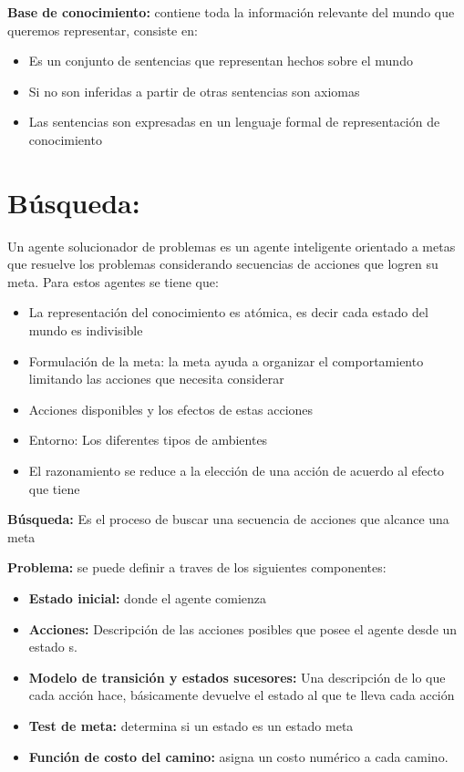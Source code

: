 \textbf{Base de conocimiento: }contiene toda la información relevante del mundo que queremos representar, consiste en: 
\begin{itemize}
  \item Es un conjunto de sentencias que representan hechos sobre el mundo
  \item Si no son inferidas a partir de otras sentencias son axiomas
  \item Las sentencias son expresadas en un lenguaje formal de representación de conocimiento
\end{itemize}

\section{Búsqueda: }
Un agente solucionador de problemas es un agente inteligente orientado a metas que resuelve los problemas considerando secuencias de acciones que logren su meta. Para estos agentes se tiene que:
\begin{itemize}
  \item La representación del conocimiento es atómica, es decir cada estado del mundo es indivisible
  \item Formulación de la meta: la meta ayuda a organizar el comportamiento limitando las acciones que necesita considerar
  \item Acciones disponibles y los efectos de estas acciones
  \item Entorno: Los diferentes tipos de ambientes
  \item El razonamiento se reduce a la elección de una acción de acuerdo al efecto que tiene
\end{itemize}

\textbf{Búsqueda: }Es el proceso de buscar una secuencia de acciones que alcance una meta

\textbf{Problema: }se puede definir a traves de los siguientes componentes:
\begin{itemize}
  \item \textbf{Estado inicial:} donde el agente comienza
  \item \textbf{Acciones:} Descripción de las acciones posibles que posee el agente desde un estado s.
  \item \textbf{Modelo de transición y estados sucesores:} Una descripción de lo que cada acción hace, básicamente devuelve el estado al que te lleva cada acción
  \item \textbf{Test de meta: }determina si un estado es un estado meta
  \item \textbf{Función de costo del camino: }asigna un costo numérico a cada camino.
\end{itemize}

